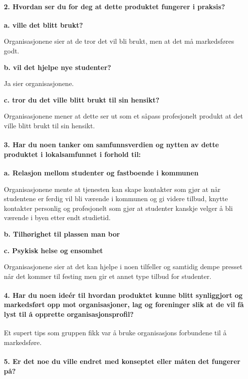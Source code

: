 \paragraph{2. Hvordan ser du for deg at dette produktet fungerer i praksis?}
{\bf a. ville det blitt brukt?}

Organisasjonene sier at de tror det vil bli brukt, men at det må markedsføres godt.

{\bf b. vil det hjelpe nye studenter?}

Ja sier organisasjonene.

{\bf c. tror du det ville blitt brukt til sin hensikt?}

Organisasjonene mener at dette ser ut som et såpass profesjonelt produkt at det ville blitt brukt til sin hensikt.

\paragraph{3. Har du noen tanker om samfunnsverdien og nytten av dette produktet i lokalsamfunnet i forhold til:}
{\bf a. Relasjon mellom studenter og fastboende i kommunen}

Organisasjonene mente at tjenesten kan skape kontakter som gjør at når studentene er ferdig vil bli værende i kommunen og gi videre tilbud, knytte kontakter personlig og profesjonelt som gjør at studenter kanskje velger å bli værende i byen etter endt studietid.

{\bf b. Tilhørighet til plassen man bor}



{\bf c. Psykisk helse og ensomhet}

Organisasjonene sier at det kan hjelpe i noen tilfeller og samtidig dempe presset når det kommer til festing men gir et annet type tilbud for studenter.

\paragraph{4. Har du noen ideér til hvordan produktet kunne blitt synliggjort og markedsført opp mot organisasjoner, lag og foreninger slik at de vil få lyst til å opprette organisasjonsprofil?}
Et supert tips som gruppen fikk var å bruke organisasjons forbundene til å markedsføre.

\paragraph{5. Er det noe du ville endret med konseptet eller måten det fungerer på?}

